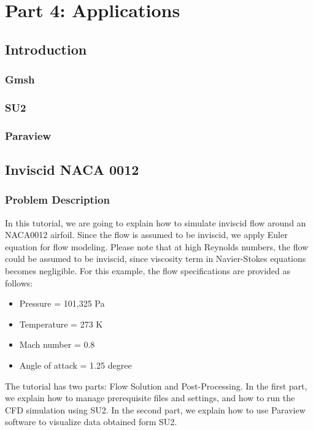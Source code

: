 \part{Part 4: Applications}
\graphicspath{ {./Pictures/tut01/} }

\chapter{Introduction}
\section{Gmsh}
\section{SU2}
\section{Paraview}

\chapter{Inviscid NACA 0012}
\section{Problem Description}
In this tutorial, we are going to explain how to simulate inviscid flow around an NACA0012 airfoil. Since the flow is assumed to be inviscid, we apply Euler equation for flow modeling. Please note that at high Reynolds numbers, the flow could be assumed to be inviscid, since viscosity term in Navier-Stokes equations becomes negligible. For this example, the flow specifications are provided as follows:
\begin{itemize}
    \item Pressure = 101,325 Pa
    \item Temperature = 273 K
    \item Mach number = 0.8
    \item Angle of attack = 1.25 degree
\end{itemize}
The tutorial has two parts: Flow Solution and Post-Processing. In the first part, we explain how to manage prerequisite files and settings, and how to run the CFD simulation using SU2. In the second part, we explain how to use Paraview software to visualize data obtained form SU2.
